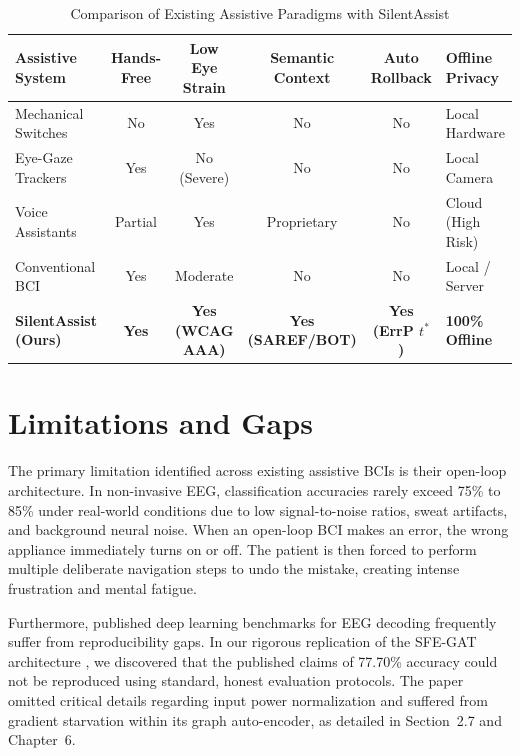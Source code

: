 \documentclass[12pt,a4paper]{report}
\begin{document}
\begin{table}[H]
\centering
\small
\caption{Comparison of Existing Assistive Paradigms with SilentAssist}
\label{tab:comparison}
\begin{tabularx}{\textwidth}{p{3.0cm} c c c c X}
\toprule
\textbf{Assistive System} & \textbf{Hands-Free} & \textbf{Low Eye Strain} & \textbf{Semantic Context} & \textbf{Auto Rollback} & \textbf{Offline Privacy} \\
\midrule
Mechanical Switches & No & Yes & No & No & Local Hardware \\
Eye-Gaze Trackers & Yes & No (Severe) & No & No & Local Camera \\
Voice Assistants & Partial & Yes & Proprietary & No & Cloud (High Risk) \\
Conventional BCI & Yes & Moderate & No & No & Local / Server \\
\textbf{SilentAssist (Ours)} & \textbf{Yes} & \textbf{Yes (WCAG AAA)} & \textbf{Yes (SAREF/BOT)} & \textbf{Yes (ErrP $t^*$)} & \textbf{100\% Offline} \\
\bottomrule
\end{tabularx}
\end{table}

\section{Limitations and Gaps}
The primary limitation identified across existing assistive BCIs is their open-loop architecture. In non-invasive EEG, classification accuracies rarely exceed 75\% to 85\% under real-world conditions due to low signal-to-noise ratios, sweat artifacts, and background neural noise. When an open-loop BCI makes an error, the wrong appliance immediately turns on or off. The patient is then forced to perform multiple deliberate navigation steps to undo the mistake, creating intense frustration and mental fatigue.

Furthermore, published deep learning benchmarks for EEG decoding frequently suffer from reproducibility gaps. In our rigorous replication of the SFE-GAT architecture \cite{gao2026sfegat}, we discovered that the published claims of 77.70\% accuracy could not be reproduced using standard, honest evaluation protocols. The paper omitted critical details regarding input power normalization and suffered from gradient starvation within its graph auto-encoder, as detailed in Section~2.7 and Chapter~6.
\end{document}
